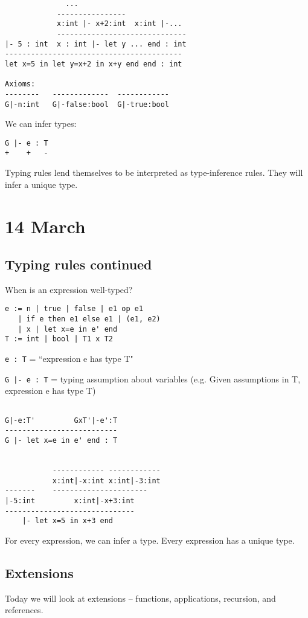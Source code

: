 \documentclass[11pt]{article}
\begin{document}
\begin{verbatim}
              ...
            ----------------
            x:int |- x+2:int  x:int |-...
            ------------------------------
|- 5 : int  x : int |- let y ... end : int
-----------------------------------------
let x=5 in let y=x+2 in x+y end end : int

Axioms:
--------   -------------  ------------
G|-n:int   G|-false:bool  G|-true:bool
\end{verbatim}

We can infer types:
\begin{verbatim}
G |- e : T
+    +   -
\end{verbatim}

Typing rules lend themselves to be interpreted as type-inference rules. They will infer a unique type.

\section{14 March}
\subsection{Typing rules continued}
When is an expression well-typed?

\begin{verbatim}
e := n | true | false | e1 op e1
   | if e then e1 else e1 | (e1, e2)
   | x | let x=e in e' end
T := int | bool | T1 x T2
\end{verbatim}

\verb~e : T~ = ``expression e has type T"


\verb~G |- e : T~ = typing assumption about variables (e.g. Given assumptions in T, expression e has type T)

\begin{verbatim}

G|-e:T'         GxT'|-e':T
--------------------------
G |- let x=e in e' end : T


           ------------ ------------
           x:int|-x:int x:int|-3:int
-------    ----------------------
|-5:int         x:int|-x+3:int
------------------------------
    |- let x=5 in x+3 end
\end{verbatim}

For every expression, we can infer a type. Every expression has a unique type.

\subsection{Extensions}
Today we will look at extensions -- functions, applications, recursion, and references. 
\end{document}
